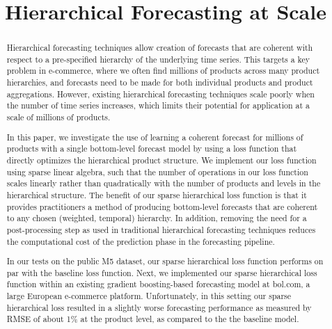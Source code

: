 \documentclass[preprint, 3p, times, twocolumn]{elsarticle}
\begin{document}
\begin{frontmatter}

\title{Hierarchical Forecasting at Scale}

\author{}



\begin{abstract}
  Hierarchical forecasting techniques allow creation of forecasts that are coherent with respect to a pre-specified hierarchy of the underlying time series. This targets a key problem in e-commerce, where we often find millions of products across many product hierarchies, and forecasts need to be made for both individual products and product aggregations. However, existing hierarchical forecasting techniques scale poorly when the number of time series increases, which limits their potential for application at a scale of millions of products. 
  
  In this paper, we investigate the use of learning a coherent forecast for millions of products with a single bottom-level forecast model by using a loss function that directly optimizes the hierarchical product structure. We implement our loss function using sparse linear algebra, such that the number of operations in our loss function scales linearly rather than quadratically with the number of products and levels in the hierarchical structure. The benefit of our sparse hierarchical loss function is that it provides practitioners a method of producing bottom-level forecasts that are coherent to any chosen (weighted, temporal) hierarchy. In addition, removing the need for a post-processing step as used in traditional hierarchical forecasting techniques reduces the computational cost of the prediction phase in the forecasting pipeline. 
  
  In our tests on the public M5 dataset, our sparse hierarchical loss function performs on par with the baseline loss function. Next, we implemented our sparse hierarchical loss function within an existing gradient boosting-based forecasting model at bol.com, a large European e-commerce platform. Unfortunately, in this setting our sparse hierarchical loss resulted in a slightly worse forecasting performance as measured by RMSE of about 1\% at the product level, as compared to the the baseline model. 
  

\end{abstract}
\end{frontmatter}
\end{document}
